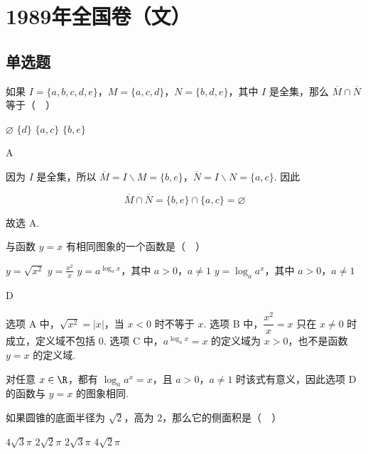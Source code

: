 \chapter{1989年全国卷（文）}

\section{单选题}

\begin{problem}
如果 \(I = \{a, b, c, d, e\}\)，\(M = \{a, c, d\}\)，\(N = \{b, d, e\}\)，其中 \(I\) 是全集，那么 \(\overline{M} \cap \overline{N}\) 等于（\(\quad\)）

\choices
    {\(\varnothing\)}
    {\(\{d\}\)}
    {\(\{a, c\}\)}
    {\(\{b, e\}\)}
\end{problem}

\begin{answer}
A
\end{answer}

\begin{solution}
因为 \(I\) 是全集，所以 \(\overline{M}=I\mathbin{\backslash}M=\{b,e\}\)，\(\overline{N}=I\mathbin{\backslash}N=\{a,c\}\). 因此

\[\overline{M}\cap\overline{N}=\{b,e\}\cap\{a,c\}=\varnothing\]

故选 A.
\end{solution}

\begin{problem}
与函数 \(y = x\) 有相同图象的一个函数是（\(\quad\)）

\choices
    {\(y = \sqrt{x^2}\)}
    {\(y = \frac{x^2}{x}\)}
    {\(y = a^{\log_a x}\)，其中 \(a > 0\)，\(a \neq 1\)}
    {\(y = \log_a a^x\)，其中 \(a > 0\)，\(a \neq 1\)}
\end{problem}

\begin{answer}
D
\end{answer}

\begin{solution}
选项 A 中，\(\sqrt{x^2}=|x|\)，当 \(x<0\) 时不等于 \(x\). 选项 B 中，\(\dfrac{x^2}{x}=x\) 只在 \(x\neq0\) 时成立，定义域不包括 \(0\). 选项 C 中，\(a^{\log_a x}=x\) 的定义域为 \(x>0\)，也不是函数 \(y=x\) 的定义域.

对任意 \(x\in\R\)，都有 \(\log_a a^x=x\)，且 \(a>0\)，\(a\neq1\) 时该式有意义，因此选项 D 的函数与 \(y=x\) 的图象相同.
\end{solution}

\begin{problem}
如果圆锥的底面半径为 \(\sqrt{2}\)，高为 \(2\)，那么它的侧面积是（\(\quad\)）

\choices
    {\(4\sqrt{3}\pi\)}
    {\(2\sqrt{2}\pi\)}
    {\(2\sqrt{3}\pi\)}
    {\(4\sqrt{2}\pi\)}
\end{problem}

